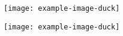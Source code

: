 \documentclass[
aspectratio=169
]{beamer}
\begin{document}
\begin{frame}
\texttt{[image: example-image-duck]}
\end{frame}

\begin{frame}
\texttt{[image: example-image-duck]}
\end{frame}
\end{document}
